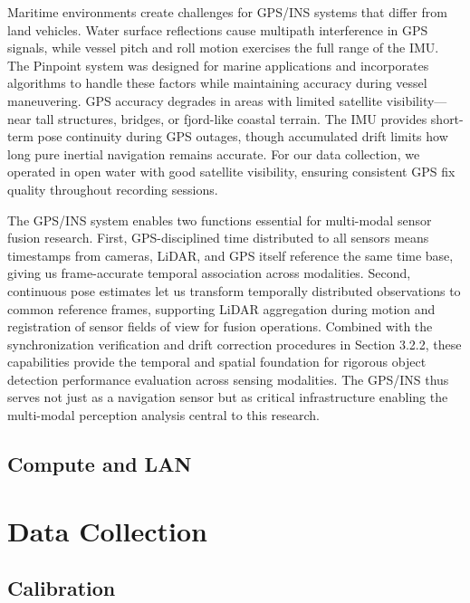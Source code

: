 \documentclass{erauthesis}
\begin{document}
Maritime environments create challenges for \ac{GPS}/\ac{INS} systems that differ from land vehicles.
Water surface reflections cause multipath interference in \ac{GPS} signals, while vessel pitch and roll motion exercises the full range of the \ac{IMU}.
The Pinpoint system was designed for marine applications and incorporates algorithms to handle these factors while maintaining accuracy during vessel maneuvering.
\ac{GPS} accuracy degrades in areas with limited satellite visibility—near tall structures, bridges, or fjord-like coastal terrain.
The \ac{IMU} provides short-term pose continuity during \ac{GPS} outages, though accumulated drift limits how long pure inertial navigation remains accurate.
For our data collection, we operated in open water with good satellite visibility, ensuring consistent \ac{GPS} fix quality throughout recording sessions.

The \ac{GPS}/\ac{INS} system enables two functions essential for multi-modal sensor fusion research.
First, \ac{GPS}-disciplined time distributed to all sensors means timestamps from cameras, \ac{LiDAR}, and \ac{GPS} itself reference the same time base, giving us frame-accurate temporal association across modalities.
Second, continuous pose estimates let us transform temporally distributed observations to common reference frames, supporting \ac{LiDAR} aggregation during motion and registration of sensor fields of view for fusion operations.
Combined with the synchronization verification and drift correction procedures in Section 3.2.2, these capabilities provide the temporal and spatial foundation for rigorous object detection performance evaluation across sensing modalities.
The \ac{GPS}/\ac{INS} thus serves not just as a navigation sensor but as critical infrastructure enabling the multi-modal perception analysis central to this research.

        \subsection{Compute and LAN}
        
    \section{Data Collection}
    
        \subsection{Calibration}
        
\end{document}
